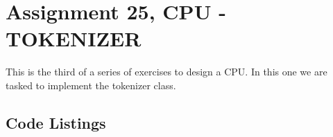 \documentclass[11pt]{article}
\begin{document}
\section*{Assignment 25, CPU - TOKENIZER}
This is the third of a series of exercises to design a CPU. In this one we are tasked to implement the tokenizer class.

\subsection*{Code Listings}







\end{document}
